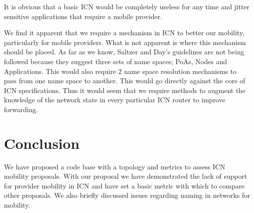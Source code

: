 \documentclass[twocolumn, a4paper]{ieicejsp}
\begin{document}
It is obvious that a basic ICN would be completely useless for any time and
jitter sensitive applications that require a mobile provider. 

We find it apparent that we require a mechanism in ICN to better our mobility,
particularly for mobile providers. What is not apparent is where this mechanism 
should be placed. As far as we know, Saltzer
\cite{saltzer:namingandbindingnetworks} and Day's guidelines
\cite{Day:2008:PNA:1349793} are not being followed because they suggest three 
sets of name spaces; PoAs, Nodes and Applications. This would also require 2 name
space resolution mechanisms to pass from one name space to another. This would
go directly against the core of ICN specifications. Thus it would seem that we
require methods to augment the knowledge of the network state in every
particular ICN router to improve forwarding.

\section{Conclusion}
We have proposed a code base with a topology and metrics to assess ICN mobility
proposals. With our proposal we have demonstrated the lack of support for
provider mobility in ICN and have set a basic metric with which to compare other
proposals. We also briefly discussed issues regarding naming in networks for 
mobility.




\end{document}
